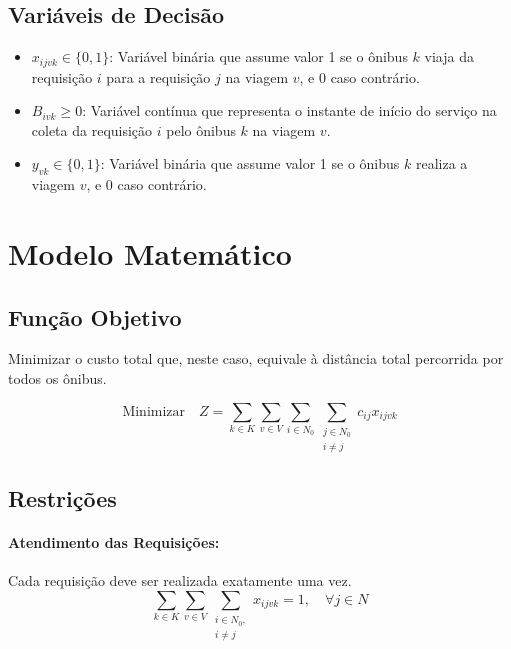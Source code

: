 \documentclass[12pt, a4paper]{article}
\begin{document}
\subsection{Variáveis de Decisão}

\begin{itemize}
    \item $x_{ijvk} \in \{0, 1\}$: Variável binária que assume valor 1 se o ônibus $k$ viaja da requisição $i$ para a requisição $j$ na viagem $v$, e 0 caso contrário.
    \item $B_{ivk} \ge 0$: Variável contínua que representa o instante de início do serviço na coleta da requisição $i$ pelo ônibus $k$ na viagem $v$.
    \item $y_{vk} \in \{0, 1\}$: Variável binária que assume valor 1 se o ônibus $k$ realiza a viagem $v$, e 0 caso contrário.
\end{itemize}

\section{Modelo Matemático}

\subsection{Função Objetivo}

Minimizar o custo total que, neste caso, equivale à distância total percorrida por todos os ônibus.

\begin{equation}
\text{Minimizar} \quad Z = \sum_{k \in K} \sum_{v \in V} \sum_{i \in N_0} \sum_{\substack{j \in N_0\\i \neq j}} c_{ij} x_{ijvk}
\end{equation}

\subsection{Restrições}

\paragraph{Atendimento das Requisições:} Cada requisição deve ser realizada exatamente uma vez.
\begin{equation}
\sum_{k \in K} \sum_{v \in V} \sum_{\substack{i \in N_0,\\i \neq j}} x_{ijvk} = 1, \quad \forall j \in N
\end{equation}
\end{document}
